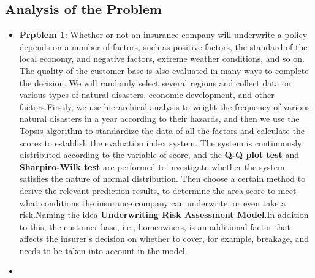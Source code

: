 \documentclass{mcmthesis}
\begin{document}
\subsection{Analysis of the Problem}
\begin{itemize}
	\item 
	\textbf{Prpblem 1}: Whether or not an insurance company will underwrite a policy depends on a number of factors, such as positive factors, the standard of the local economy, and negative factors, extreme weather conditions, and so on. The quality of the customer base is also evaluated in many ways to complete the decision. We will randomly select several regions and collect data on various types of natural disasters, economic development, and other factors.Firstly, we use hierarchical analysis to weight the frequency of various natural disasters in a year according to their hazards, and then we use the Topsis algorithm to standardize the data of all the factors and calculate the scores to establish the evaluation index system. The system is continuously distributed according to the variable of score, and the \textbf{Q-Q plot test} and \textbf{Sharpiro-Wilk test} are performed to investigate whether the system satisfies the nature of normal distribution. Then choose a certain method to derive the relevant prediction results, to determine the area score to meet what conditions the insurance company can underwrite, or even take a risk.Naming the idea \textbf{Underwriting Risk Assessment Model}.In addition to this, the customer base, i.e., homeowners, is an additional factor that affects the insurer's decision on whether to cover, for example, breakage, and needs to be taken into account in the model.
	\item 

\end{itemize}
\end{document}
